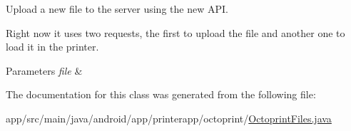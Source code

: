 Upload a new file to the server using the new A\+PI.

Right now it uses two requests, the first to upload the file and another one to load it in the printer. 
\begin{DoxyParams}{Parameters}
{\em file} & \\
\hline
\end{DoxyParams}


The documentation for this class was generated from the following file\+:\begin{DoxyCompactItemize}
\item 
app/src/main/java/android/app/printerapp/octoprint/\hyperlink{_octoprint_files_8java}{Octoprint\+Files.\+java}\end{DoxyCompactItemize}
